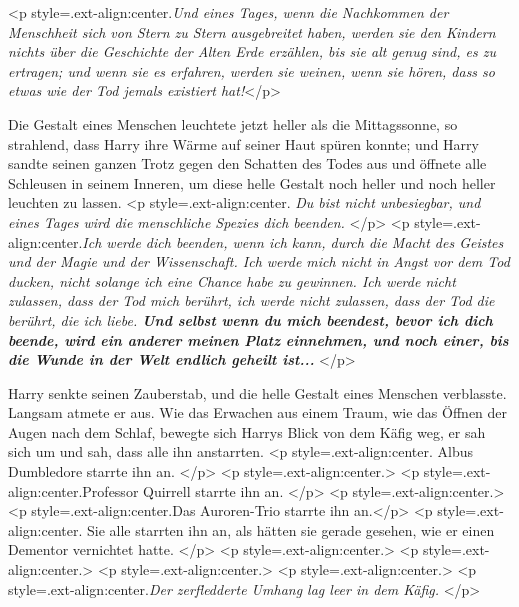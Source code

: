 <p style=\grqq{}.ext-align:center\grqq{}.\emph{Und eines Tages, wenn die
Nachkommen der Menschheit sich von Stern zu Stern ausgebreitet haben, werden sie
den Kindern nichts über die Geschichte der Alten Erde erzählen, bis sie alt
genug sind, es zu ertragen; und wenn sie es erfahren, werden sie weinen, wenn
sie hören, dass so etwas wie der Tod jemals existiert hat!}</p>

Die Gestalt eines Menschen leuchtete jetzt heller als die Mittagssonne, so
strahlend, dass Harry ihre Wärme auf seiner Haut spüren konnte; und Harry sandte
seinen ganzen Trotz gegen den Schatten des Todes aus und öffnete alle Schleusen
in seinem Inneren, um diese helle Gestalt noch heller und noch heller leuchten
zu lassen. <p style=\grqq{}.ext-align:center\grqq{}. \emph{ Du bist nicht
unbesiegbar, und eines Tages wird die menschliche Spezies dich beenden. }</p> <p
style=\grqq{}.ext-align:center\grqq{}.\emph{Ich werde dich beenden, wenn ich
kann, durch die Macht des Geistes und der Magie und der Wissenschaft. Ich werde
mich nicht in Angst vor dem Tod ducken, nicht solange ich eine Chance habe zu
gewinnen. Ich werde nicht zulassen, dass der Tod mich berührt, ich werde nicht
zulassen, dass der Tod die berührt, die ich liebe. \textbf{ Und selbst wenn du
mich beendest, bevor ich dich beende, wird ein anderer meinen Platz einnehmen,
und noch einer, bis die Wunde in der Welt endlich geheilt ist... }}</p>

Harry senkte seinen Zauberstab, und die helle Gestalt eines Menschen verblasste.
Langsam atmete er aus. Wie das Erwachen aus einem Traum, wie das Öffnen der
Augen nach dem Schlaf, bewegte sich Harrys Blick von dem Käfig weg, er sah sich
um und sah, dass alle ihn anstarrten. <p style=\grqq{}.ext-align:center\grqq{}.
Albus Dumbledore starrte ihn an. </p> <p style=\grqq{}.ext-align:center\grqq{}.>
<p style=\grqq{}.ext-align:center\grqq{}.Professor Quirrell starrte ihn an. </p>
<p style=\grqq{}.ext-align:center\grqq{}.> <p
style=\grqq{}.ext-align:center\grqq{}.Das Auroren-Trio starrte ihn an.</p> <p
style=\grqq{}.ext-align:center\grqq{}. Sie alle starrten ihn an, als hätten sie
gerade gesehen, wie er einen Dementor vernichtet hatte. </p> <p
style=\grqq{}.ext-align:center\grqq{}.> <p
style=\grqq{}.ext-align:center\grqq{}.> <p
style=\grqq{}.ext-align:center\grqq{}.> <p
style=\grqq{}.ext-align:center\grqq{}.> <p
style=\grqq{}.ext-align:center\grqq{}.\emph{Der zerfledderte Umhang lag leer in
dem Käfig. }</p>

